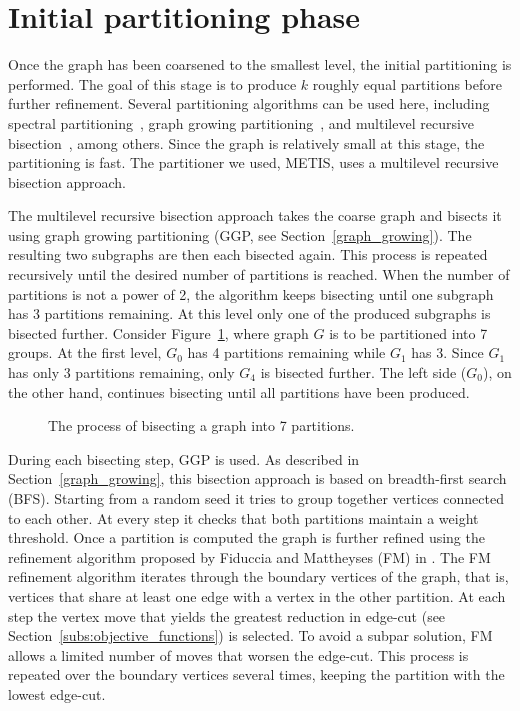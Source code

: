 \section{Initial partitioning phase} \label{sec:initial_partitioning}
Once the graph has been coarsened to the smallest level, the initial partitioning is performed. The goal of this stage is to produce $k$ roughly equal partitions before further refinement. Several partitioning algorithms can be used here, including spectral partitioning~\cite{hendrickson_multilevel_1995}, graph growing partitioning~\cite{KarypisGeorge1998AFaH}, and multilevel recursive bisection~\cite{simon_recursive_bisection}, among others. Since the graph is relatively small at this stage, the partitioning is fast. The partitioner we used, METIS, uses a multilevel recursive bisection approach.

The multilevel recursive bisection approach takes the coarse graph and bisects it using graph growing partitioning (GGP, see Section~\ref{graph_growing}). The resulting two subgraphs are then each bisected again. This process is repeated recursively until the desired number of partitions is reached. When the number of partitions is not a power of 2, the algorithm keeps bisecting until one subgraph has 3 partitions remaining. At this level only one of the produced subgraphs is bisected further. Consider Figure~\ref{fig:tree}, where graph $G$ is to be partitioned into 7 groups. At the first level, $G_0$ has 4 partitions remaining while $G_1$ has 3. Since $G_1$ has only 3 partitions remaining, only $G_4$ is bisected further. The left side ($G_0$), on the other hand, continues bisecting until all partitions have been produced.

\begin{figure}[h]
	\centering
	\scalebox{0.65}{}
	\caption{The process of bisecting a graph into 7 partitions.}
	\label{fig:tree}
\end{figure}

During each bisecting step, GGP is used. As described in Section~\ref{graph_growing}, this bisection approach is based on breadth-first search (BFS). Starting from a random seed it tries to group together vertices connected to each other. At every step it checks that both partitions maintain a weight threshold. Once a partition is computed the graph is further refined using the refinement algorithm proposed by Fiduccia and Mattheyses (FM) in \cite{fiduccia_fm}. The FM refinement algorithm iterates through the boundary vertices of the graph, that is, vertices that share at least one edge with a vertex in the other partition. At each step the vertex move that yields the greatest reduction in edge-cut (see Section~\ref{subs:objective_functions}) is selected. To avoid a subpar solution, FM allows a limited number of moves that worsen the edge-cut. This process is repeated over the boundary vertices several times, keeping the partition with the lowest edge-cut.

